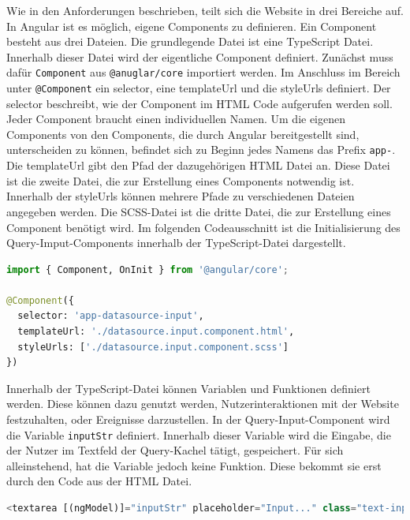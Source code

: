 Wie in den Anforderungen beschrieben, teilt sich die Website in drei Bereiche auf. In Angular ist es möglich, eigene Components zu definieren. Ein Component besteht aus drei Dateien. Die grundlegende Datei ist eine TypeScript Datei. Innerhalb dieser Datei wird der eigentliche Component definiert. Zunächst muss dafür \texttt{Component} aus \texttt{@anuglar/core} importiert werden. Im Anschluss im Bereich unter \texttt{@Component} ein selector, eine templateUrl und die styleUrls definiert. Der selector beschreibt, wie der Component im HTML Code aufgerufen werden soll. Jeder Component braucht einen individuellen Namen. Um die eigenen Components von den Components, die durch Angular bereitgestellt sind, unterscheiden zu können, befindet sich zu Beginn jedes Namens das Prefix \texttt{app-}. Die templateUrl gibt den Pfad der dazugehörigen HTML Datei an. Diese Datei ist die zweite Datei, die zur Erstellung eines Components notwendig ist. Innerhalb der styleUrls können mehrere Pfade zu verschiedenen Dateien angegeben werden. Die SCSS-Datei ist die dritte Datei, die zur Erstellung eines Component benötigt wird. Im folgenden Codeausschnitt ist die Initialisierung des Query-Imput-Components innerhalb der TypeScript-Datei dargestellt.

\begin{lstlisting}[language=Python, caption={Definition eines Components}]
import { Component, OnInit } from '@angular/core';

@Component({
  selector: 'app-datasource-input',
  templateUrl: './datasource.input.component.html',
  styleUrls: ['./datasource.input.component.scss']
})
\end{lstlisting}

Innerhalb der TypeScript-Datei können Variablen und Funktionen definiert werden. Diese können dazu genutzt werden, Nutzerinteraktionen mit der Website festzuhalten, oder Ereignisse darzustellen. In der Query-Input-Component wird die Variable \texttt{inputStr} definiert. Innerhalb dieser Variable wird die Eingabe, die der Nutzer im Textfeld der Query-Kachel tätigt, gespeichert. Für sich alleinstehend, hat die Variable jedoch keine Funktion. Diese bekommt sie erst durch den Code aus der HTML Datei. 

\begin{lstlisting}[language=Python, caption={Erstellung einer Textarea innerhalb der HTML-Datei}]
<textarea [(ngModel)]="inputStr" placeholder="Input..." class="text-input"></textarea>
\end{lstlisting}

